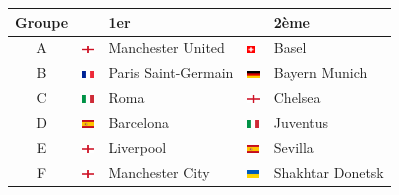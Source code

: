 \documentclass{../ficheTDTP}
\begin{document}
\begin{tabular}{|c|ll|ll|}
\hline
Groupe & & 1er & & 2ème \\ \hline
A & \includegraphics[height=0.2cm]{flags/en.png} & Manchester United & \includegraphics[height=0.2cm]{flags/ch.png} & Basel \\ \hline
B & \includegraphics[height=0.2cm]{flags/fr.png} & Paris Saint-Germain & \includegraphics[height=0.2cm]{flags/de.png} & Bayern Munich \\ \hline
C & \includegraphics[height=0.2cm]{flags/it.png} & Roma & \includegraphics[height=0.2cm]{flags/en.png} & Chelsea \\ \hline
D & \includegraphics[height=0.2cm]{flags/es.png} & Barcelona & \includegraphics[height=0.2cm]{flags/it.png} & Juventus \\ \hline
E & \includegraphics[height=0.2cm]{flags/en.png} & Liverpool & \includegraphics[height=0.2cm]{flags/es.png} & Sevilla \\ \hline
F & \includegraphics[height=0.2cm]{flags/en.png} & Manchester City & \includegraphics[height=0.2cm]{flags/ua.png} & Shakhtar Donetsk \\ \hline

\end{tabular}
\end{document}

